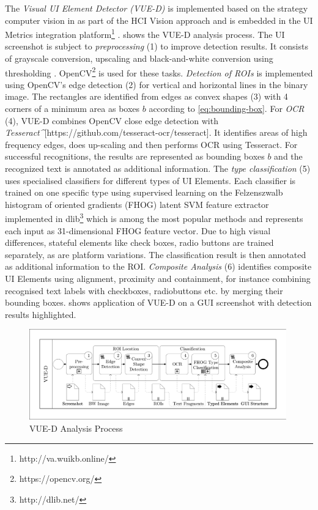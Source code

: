 The \emph{Visual UI Element Detector (VUE-D)} is implemented based on the strategy computer vision in \autocite{Kong2012} as part of the HCI Vision approach \autocite{Bakaev2019JWE,Bakaev2018ICWE} and is embedded in the UI Metrics integration platform\footnote{http://va.wuikb.online/} \autocite{Bakaev2019ICWE}.
 shows the VUE-D analysis process.
The UI screenshot is subject to \emph{preprocessing} (1) to improve detection results.
It consists of grayscale conversion, upscaling and black-and-white conversion using thresholding \autocite[cf.~][]{RayLiu2002}.
OpenCV\footnote{https://opencv.org/} is used for these tasks.
\emph{Detection of ROIs} is implemented using OpenCV's edge detection (2) for vertical and horizontal lines in the binary image.
The rectangles are identified from edges as convex shapes (3) with 4 corners of a minimum area as boxes \(b\) according to \cref{eq:bounding-box}.
For \emph{OCR} (4), VUE-D combines OpenCV close edge detection with \emph{Tesseract\^{}}{[}https://github.com/tesseract-ocr/tesseract{]}.
It identifies areas of high frequency edges, does up-scaling and then performs OCR using Tesseract.
For successful recognitions, the results are represented as bounding boxes \(b\) and the recognized text is annotated as additional information.
The \emph{type classification} (5) uses specialised classifiers for different types of UI Elements.
Each classifier is trained on one specific type using supervised learning on the Felzenszwalb histogram of oriented gradients (FHOG) latent SVM feature \autocite{Felzenszwalb2010FHOG} extractor implemented in dlib\footnote{http://dlib.net/} which is among the most popular methods \autocite{Liu2017DNNSurvey} and represents each input as 31-dimensional FHOG feature vector.
Due to high visual differences, stateful elements like check boxes, radio buttons are trained separately, as are platform variations.
The classification result is then annotated as additional information to the ROI.
\emph{Composite Analysis} (6) identifies composite UI Elements using alignment, proximity and containment, for instance combining recognised text labels with checkboxes, radiobuttons etc.
by merging their bounding boxes.
 shows application of VUE-D on a GUI screenshot with detection results highlighted.

\begin{figure}
\hypertarget{fig:ci-vued}{%
\centering
\includegraphics[width=0.99\textwidth]{../figures/awsm-ci-vued.pdf}
\caption{VUE-D Analysis Process}\label{fig:ci-vued}
}
\end{figure}

